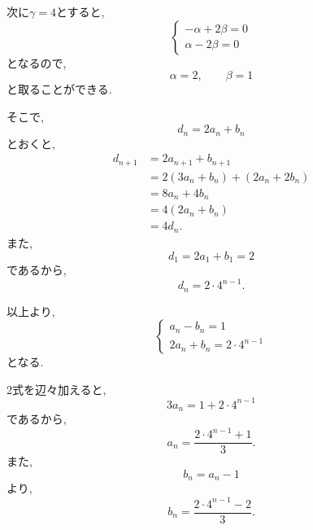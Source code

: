 \begin{enumerate}[label=(\arabic*),parsep=3pt]
          次に$\gamma=4$とすると,
          \[
          \begin{cases}
            -\alpha+2\beta=0\\
            \alpha-2\beta=0
          \end{cases}
          \]
          となるので,
          \[
            \alpha=2,\qquad\beta=1
          \]
          と取ることができる.

          そこで,
          \[
            d_n=2a_n+b_n
          \]
          とおくと,
          \begin{align*}
            d_{n+1}
              &=2a_{n+1}+b_{n+1}\\
              &=2(3a_n+b_n)+(2a_n+2b_n)\\
              &=8a_n+4b_n\\
              &=4(2a_n+b_n)\\
              &=4d_n.
          \end{align*}
          また,
          \[
            d_1=2a_1+b_1=2
          \]
          であるから,
          \[
            d_n=2\cdot4^{n-1}.
          \]

          以上より,
          \[
          \begin{cases}
            a_n-b_n=1\\
            2a_n+b_n=2\cdot4^{n-1}
          \end{cases}
          \]
          となる.

          2式を辺々加えると,
          \[
            3a_n=1+2\cdot4^{n-1}
          \]
          であるから,
          \[
            a_n=\frac{2\cdot4^{n-1}+1}{3}.
          \]
          また,
          \[
            b_n=a_n-1
          \]
          より,
          \[
            b_n=\frac{2\cdot4^{n-1}-2}{3}.
          \]
    \end{enumerate}


